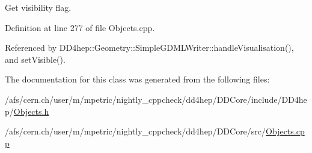Get visibility flag. 

Definition at line 277 of file Objects.cpp.

Referenced by DD4hep::Geometry::SimpleGDMLWriter::handleVisualisation(), and setVisible().

The documentation for this class was generated from the following files:\begin{DoxyCompactItemize}
\item 
/afs/cern.ch/user/m/mpetric/nightly\_\-cppcheck/dd4hep/DDCore/include/DD4hep/\hyperlink{_objects_8h}{Objects.h}\item 
/afs/cern.ch/user/m/mpetric/nightly\_\-cppcheck/dd4hep/DDCore/src/\hyperlink{_objects_8cpp}{Objects.cpp}\end{DoxyCompactItemize}
